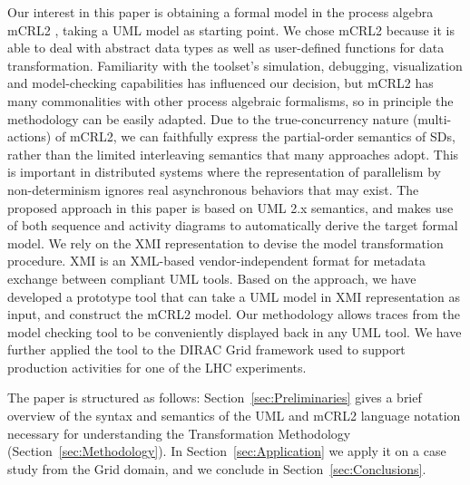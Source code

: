 \documentclass[letter]{llncs}
\newcommand{\secshrink}{\vspace{-.5cm}}
\begin{document}
Our interest in this paper is obtaining a formal model in the process algebra mCRL2
\cite{mCRL2},
taking a UML model as starting point. We chose mCRL2 because it is able to deal
with abstract
data types as well as user-defined functions for data transformation.
Familiarity with the toolset's simulation,
debugging,
visualization and model-checking capabilities has
influenced our decision, but mCRL2 has many commonalities with
other process algebraic formalisms,
so in principle the methodology can be easily adapted.
Due to the true-concurrency nature (multi-actions) of mCRL2, we can faithfully express the
partial-order semantics of SDs, rather than the limited interleaving semantics that many approaches 
adopt. This is important in distributed systems where the representation of parallelism by non-determinism
ignores real asynchronous behaviors that may exist.
The proposed approach in this paper is based on UML 2.x semantics, and makes use
of both sequence and activity diagrams to automatically derive the target formal model.
We rely on the XMI representation
to devise the model transformation procedure. XMI \cite{UML2.4} is an XML-based vendor-independent format for metadata exchange between
compliant UML tools.
Based on the approach, we have
developed 
a prototype tool that can take a UML model in XMI representation as input, and
construct
the mCRL2 model. Our methodology allows traces from the model
checking tool 
to be conveniently displayed back in any UML tool. 
We have further applied the tool to the DIRAC \cite{DIRAC_CommGridSolution} Grid
framework used to support production activities
for one of the LHC experiments. 

The paper is structured as follows: Section~\ref{sec:Preliminaries} gives a brief overview of the 
syntax and semantics of the UML and mCRL2 language notation necessary for understanding the Transformation Methodology (Section~\ref{sec:Methodology}).
In Section~\ref{sec:Application} we apply it on a case study from the Grid domain, and we conclude in Section~\ref{sec:Conclusions}.
\vspace{-2 pt}
\secshrink
\end{document}
